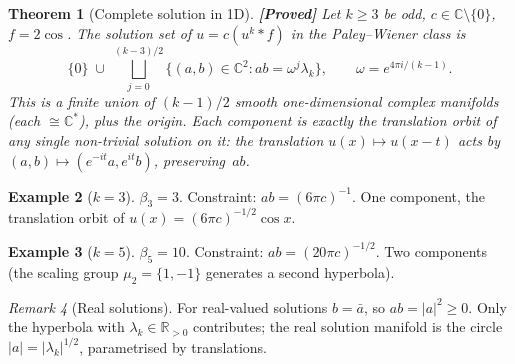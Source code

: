 \documentclass[12pt]{article}
\newtheorem{theorem}{Theorem}[section]
\theoremstyle{definition}
\newtheorem{example}[theorem]{Example}
\theoremstyle{remark}
\newtheorem{remark}[theorem]{Remark}
\newcommand{\R}{\mathbb{R}}
\newcommand{\C}{\mathbb{C}}
\newcommand{\proven}{\textbf{\color{teal}[Proved]}}
\begin{document}
\begin{theorem}[Complete solution in 1D]  \label{thm:main-1d}
  \proven\quad
  Let $k\geq 3$ be odd, $c\in\C\setminus\{0\}$, $f=2\cos$.
  The solution set of $u=c(u^k\ast f)$ in the Paley--Wiener class is
  \[
    \{0\}
    \;\cup\;
    \bigsqcup_{j=0}^{(k-3)/2}
      \{(a,b)\in\C^2:ab=\omega^j\lambda_k\},
    \qquad \omega=e^{4\pi i/(k-1)}.
  \]
  This is a finite union of $(k-1)/2$ smooth one-dimensional complex
  manifolds (each $\cong\C^*$), plus the origin.
  Each component is exactly the translation orbit of any single non-trivial
  solution on it: the translation $u(x)\mapsto u(x-t)$ acts by
  $(a,b)\mapsto(e^{-it}a,e^{it}b)$, preserving~$ab$.
\end{theorem}

\begin{example}[$k=3$]
  $\beta_3=3$.  Constraint: $ab=(6\pi c)^{-1}$.  One component, the
  translation orbit of $u(x)=(6\pi c)^{-1/2}\cos x$.
\end{example}

\begin{example}[$k=5$]
  $\beta_5=10$.  Constraint: $ab=(20\pi c)^{-1/2}$.  Two components
  (the scaling group $\mu_2=\{1,-1\}$ generates a second hyperbola).
\end{example}

\begin{remark}[Real solutions]
  For real-valued solutions $b=\bar a$, so $ab=|a|^2\geq 0$.  Only the
  hyperbola with $\lambda_k\in\R_{>0}$ contributes; the real solution
  manifold is the circle $|a|=|\lambda_k|^{1/2}$, parametrised by
  translations.
\end{remark}

\end{document}
